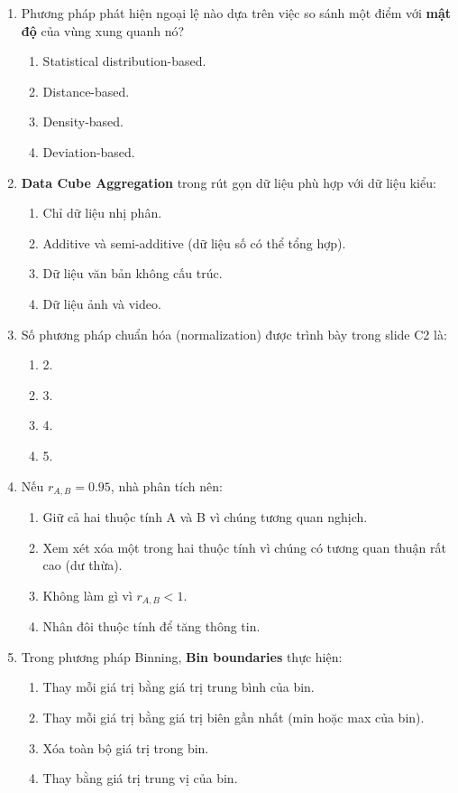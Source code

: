 \documentclass[10pt]{article}
\begin{document}
\begin{enumerate}[leftmargin=*, label=\textbf{Câu \arabic*.}]
    \item Phương pháp phát hiện ngoại lệ nào dựa trên việc so sánh một điểm với \textbf{mật độ} của vùng xung quanh nó?
    \begin{enumerate}[label=\Alph*.]
        \item Statistical distribution-based.
        \item Distance-based.
        \item Density-based.
        \item Deviation-based.
    \end{enumerate}

    \item \textbf{Data Cube Aggregation} trong rút gọn dữ liệu phù hợp với dữ liệu kiểu:
    \begin{enumerate}[label=\Alph*.]
        \item Chỉ dữ liệu nhị phân.
        \item Additive và semi-additive (dữ liệu số có thể tổng hợp).
        \item Dữ liệu văn bản không cấu trúc.
        \item Dữ liệu ảnh và video.
    \end{enumerate}

    \item Số phương pháp chuẩn hóa (normalization) được trình bày trong slide C2 là:
    \begin{enumerate}[label=\Alph*.]
        \item 2.
        \item 3.
        \item 4.
        \item 5.
    \end{enumerate}

    \item Nếu $r_{A,B} = 0.95$, nhà phân tích nên:
    \begin{enumerate}[label=\Alph*.]
        \item Giữ cả hai thuộc tính A và B vì chúng tương quan nghịch.
        \item Xem xét xóa một trong hai thuộc tính vì chúng có tương quan thuận rất cao (dư thừa).
        \item Không làm gì vì $r_{A,B} < 1$.
        \item Nhân đôi thuộc tính để tăng thông tin.
    \end{enumerate}

    \item Trong phương pháp Binning, \textbf{Bin boundaries} thực hiện:
    \begin{enumerate}[label=\Alph*.]
        \item Thay mỗi giá trị bằng giá trị trung bình của bin.
        \item Thay mỗi giá trị bằng giá trị biên gần nhất (min hoặc max của bin).
        \item Xóa toàn bộ giá trị trong bin.
        \item Thay bằng giá trị trung vị của bin.
    \end{enumerate}


\end{enumerate}
\end{document}
